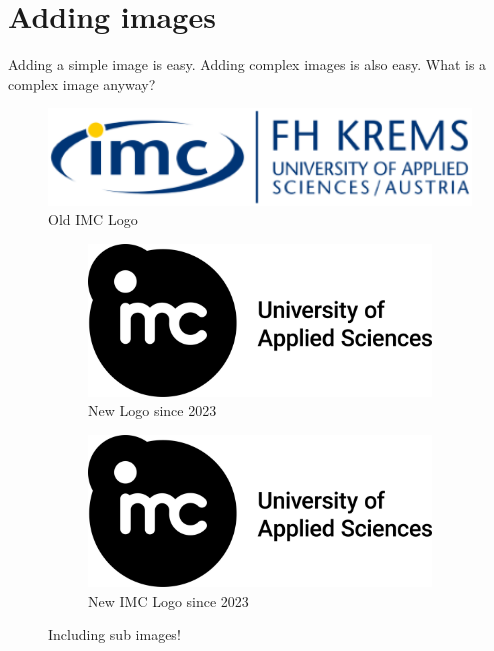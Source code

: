 \documentclass{imc-inf}
\begin{document}
\section{Adding images}
Adding a simple image is easy. Adding complex images is also easy. What is a complex image anyway? 
\begin{figure}[h]
	\centering
	\includegraphics[width=1.0\textwidth]{imclogo.png}
	\caption{Old IMC Logo}
	\label{fig:logo}
\end{figure}





\begin{figure}[ht]
	\begin{subfigure}{.5\textwidth}
		\centering
		\includegraphics[width=.8\linewidth]{imc_logo_print.jpg}  
		\caption{New Logo since 2023}
		\label{fig:sub-first}
	\end{subfigure}
	\begin{subfigure}{.5\textwidth}
		\centering
		\includegraphics[width=.8\linewidth]{imc_logo_print.jpg}  
		\caption{New IMC Logo since 2023}
		\label{fig:sub-second}
	\end{subfigure}
	\caption{Including sub images! }
	\label{fig:fig}
\end{figure}
\end{document}
